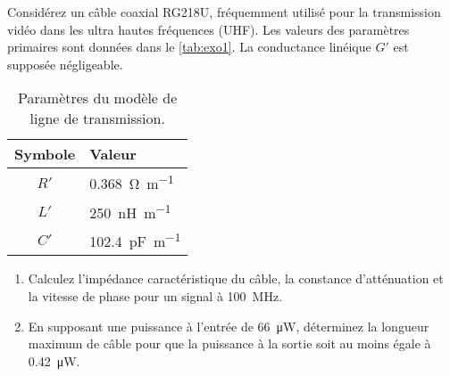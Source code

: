 \documentclass [a4paper, 11pt] {article}
\begin{document}
    \begin{exercice}{1}
        Considérez un câble coaxial RG218U, fréquemment utilisé pour la transmission vidéo dans les ultra hautes fréquences (UHF). Les valeurs des paramètres primaires sont données dans le \autoref{tab:exo1}. La conductance linéique $G'$ est supposée négligeable.
        
        \begin{table}[H]
            \centering
            \begin{tabular}{cl}
                Symbole & Valeur \\
                \hline
                $R'$ & \SI{0.368}{\ohm\per\meter} \\
                $L'$ & \SI{250}{\nano\henry\per\meter} \\
                $C'$ & \SI{102.4}{\pico\farad\per\meter}
            \end{tabular}
            \caption{Paramètres du modèle de ligne de transmission.}
            \label{tab:exo1}
        \end{table}
        
        \begin{enumerate}
            \item Calculez l'impédance caractéristique du câble, la constance d'atténuation et la vitesse de phase pour un signal à \SI{100}{\mega\hertz}.
            \item En supposant une puissance à l'entrée de \SI{66}{\micro\watt}, déterminez la longueur maximum de câble pour que la puissance à la sortie soit au moins égale à \SI{0.42}{\micro\watt}.
        \end{enumerate}
    \end{exercice}
    
\end{document}
